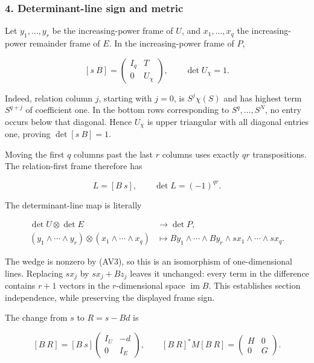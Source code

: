 \documentclass{article}
\begin{document}
\subsubsection{4. Determinant-line sign and metric}\label{endpoint-variation_review--determinant-line-sign-and-metric}

Let \(y_1,\ldots,y_r\) be the increasing-power frame of \(U\), and \(x_1,\ldots,x_q\) the increasing-power remainder frame of \(E\). In the increasing-power frame of \(P\),

\[
[s\ B]=
\begin{pmatrix}I_q&T\\0&U_\chi\end{pmatrix},\qquad
\det U_\chi=1.
\tag{AV12}
\]

Indeed, relation column \(j\), starting with \(j=0\), is \(S^j\chi(S)\) and has highest term \(S^{q+j}\) of coefficient one. In the bottom rows corresponding to \(S^q,\ldots,S^N\), no entry occurs below that diagonal. Hence \(U_\chi\) is upper triangular with all diagonal entries one, proving \(\det[s\ B]=1\).

Moving the first \(q\) columns past the last \(r\) columns uses exactly \(qr\) transpositions. The relation-first frame therefore has

\[
L=[B\ s],\qquad \det L=(-1)^{qr}.
\tag{AV13}
\]

The determinant-line map is literally

\[
\begin{aligned}
\det U\otimes\det E&\longrightarrow\det P,\\
(y_1\wedge\cdots\wedge y_r)\otimes(x_1\wedge\cdots\wedge x_q)
&\longmapsto
By_1\wedge\cdots\wedge By_r
\wedge sx_1\wedge\cdots\wedge sx_q .
\end{aligned}
\tag{AV14}
\]

The wedge is nonzero by (AV3), so this is an isomorphism of one-dimensional lines. Replacing \(sx_j\) by \(sx_j+Bz_j\) leaves it unchanged: every term in the difference contains \(r+1\) vectors in the \(r\)-dimensional space \(\operatorname{im}B\). This establishes section independence, while preserving the displayed frame sign.

The change from \(s\) to \(R=s-Bd\) is

\[
[B\ R]=[B\ s]
\begin{pmatrix}I_U&-d\\0&I_E\end{pmatrix},
\qquad
[B\ R]^*M[B\ R]=
\begin{pmatrix}H&0\\0&G\end{pmatrix}.
\tag{AV15}
\]
\end{document}

